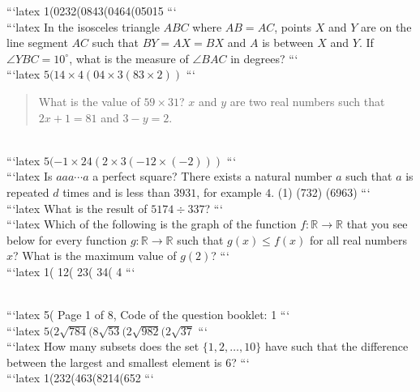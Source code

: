 ```latex
1(0232(0843(0464(05015
```
\\
```latex
In the isosceles triangle $ABC$ where $AB = AC$, points $X$ and $Y$ are on the line segment $AC$ such that $BY = AX = BX$ and $A$ is between $X$ and $Y$. If $\angle YBC = 10^\circ$, what is the measure of $\angle BAC$ in degrees?
```
\\
```latex
$5(14 \times 4(04 \times 3(83 \times 2))$
```
\\
\begin{quote}
What is the value of $59 \times 31$? $x$ and $y$ are two real numbers such that $2x + 1 = 81$ and $3 - y = 2$. 
\end{quote}
\\
```latex
$5(-1 \times 24(2 \times 3(-12 \times (-2)))$
```
\\
```latex
Is $aaa\cdots a$ a perfect square? There exists a natural number $a$ such that $a$ is repeated $d$ times and is less than $3931$, for example $4$. (1) (732) (6963)
```
\\
```latex
What is the result of $5174 \div 337$?
```
\\
```latex
Which of the following is the graph of the function $f: \mathbb{R} \to \mathbb{R}$ that you see below for every function $g: \mathbb{R} \to \mathbb{R}$ such that $g(x) \leq f(x)$ for all real numbers $x$? What is the maximum value of $g(2)$?
```
\\
```latex
1(
12(
23(
34(
4
```

\\
```latex
5(
Page 1 of 8, Code of the question booklet: 1
```
\\
```latex
$5(2 \sqrt{784}(8 \sqrt{53}(2 \sqrt{982}(2 \sqrt{37}$
```
\\
```latex
How many subsets does the set $\{1, 2, \ldots, 10\}$ have such that the difference between the largest and smallest element is 6?
```
\\
```latex
1(232(463(8214(652
```
\\
\documentclass{article}
\usepackage{amsmath}


The country of Shakrestan is composed of three provinces: Namakstan, Felfelstan, and Somaqstan, which have a total of 8 cities. We know that the number of citizens in the different cities of this country is $2n$ and $n$, respectively. In which of the ranges is the number $n$ such that $n^2 + n + 1$ is a perfect square and the total population of the country is below this number?


\\
```latex
What is the value of the expression $1  \times (11  \times (12  \times (13 )))$?
```
\\
```latex
5
```
\\
```latex
In the trapezoid $ABCD$, $AB \parallel CD$ and $CD = 3AB$. The points $M$ and $N$ are the midpoints of $AB$ and $CD$, respectively. The area of the trapezoid is $23$. What is the area of triangle $AMN$?
```
\\
```latex
For how many integer values of $n$ does the polynomial $x^3 + x - n^2$ and $x^3 + nx - 1$ have a common real root?
```

